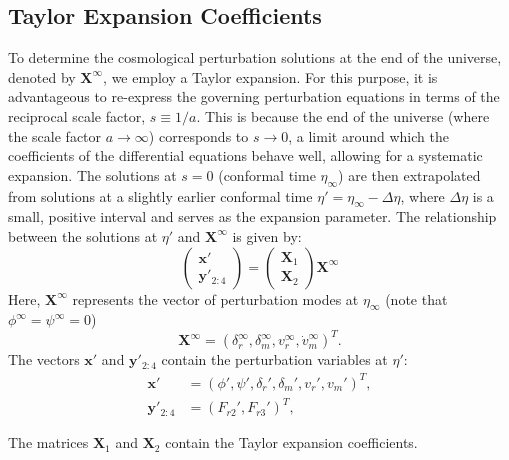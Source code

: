 \begin{subappendices}
\section{Taylor Expansion Coefficients}\label{sec:Taylor}
To determine the cosmological perturbation solutions at the end of the universe, denoted by $\mathbf{X}^\infty$, we employ a Taylor expansion. For this purpose, it is advantageous to re-express the governing perturbation equations in terms of the reciprocal scale factor, $s \equiv 1/a$. This is because the end of the universe (where the scale factor $a \to \infty$) corresponds to $s \to 0$, a limit around which the coefficients of the differential equations behave well, allowing for a systematic expansion. The solutions at $s=0$ (conformal time $\eta_\infty$) are then extrapolated from solutions at a slightly earlier conformal time $\eta' = \eta_\infty - \Delta\eta$, where $\Delta\eta$ is a small, positive interval and serves as the expansion parameter. The relationship between the solutions at $\eta'$ and $\mathbf{X}^\infty$ is given by:
\begin{equation}\label{eq:taylor_relation}
\begin{pmatrix}
\mathbf{x}' \\
\mathbf{y}'_{2:4}
\end{pmatrix}
=
\begin{pmatrix}
\mathbf{X}_1 \\
\mathbf{X}_2
\end{pmatrix}
\mathbf{X}^\infty
\end{equation}
Here, $\mathbf{X}^\infty$ represents the vector of perturbation modes at $\eta_\infty$ (note that $\phi^\infty=\psi^\infty=0$)
\begin{equation}\label{eq:X_infty_def}
    \mathbf{X}^\infty = (\delta_r^\infty, \delta_m^\infty, v_r^\infty, \dot{v}_m^\infty)^T.
\end{equation}
The vectors $\mathbf{x}'$ and $\mathbf{y}'_{2:4}$ contain the perturbation variables at $\eta'$:
\begin{equation}\label{eq:xy_prime_def}
\begin{aligned}
    \mathbf{x}' &= (\phi', \psi', \delta_r', \delta_m', v_r', v_m')^T, \\
    \mathbf{y}'_{2:4} &= (F_{r2}', F_{r3}')^T,
\end{aligned}
\end{equation}

The matrices $\mathbf{X}_1$ and $\mathbf{X}_2$ contain the Taylor expansion coefficients.


\end{subappendices}
